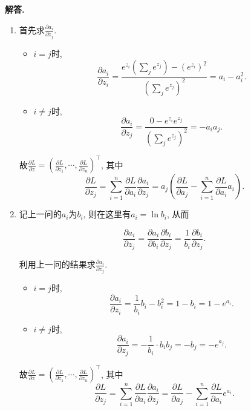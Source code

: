\documentclass[11pt]{article}
\newenvironment{solution}{\par\noindent\textbf{解答. }}{\par}
\begin{document}
	\section{}
	\begin{solution}
		\begin{enumerate}[(1)]
			\item 首先求$\frac{\partial a_i}{\partial z_j}$.
			
			\begin{itemize}
				\item $i=j$时, $$\frac{\partial a_i}{\partial z_i}=\frac{e^{z_i}(\sum_j e^{z_j})-(e^{z_i})^2}{(\sum_j e^{z_j})^2}=a_i-a_i^2.$$
				\item $i\neq j$时, $$\frac{\partial a_i}{\partial z_j}=\frac{0-e^{z_i}e^{z_j}}{(\sum_j e^{z_j})^2}=-a_ia_j.$$
			\end{itemize}

			故$\frac{\partial L}{\partial z}=\left(\frac{\partial L}{\partial z_1},\cdots,\frac{\partial L}{\partial z_n}\right)^\top$, 其中 $$\frac{\partial L}{\partial z_j}=\sum_{i=1}^n \frac{\partial L}{\partial a_i}\frac{\partial a_i}{\partial z_j}=a_j\left(\frac{\partial L}{\partial a_j}-\sum_{i=1}^n \frac{\partial L}{\partial a_i}a_i\right).$$

			\item 记上一问的$a_i$为$b_i$, 则在这里有$a_i=\ln b_i$, 从而
			
			$$\frac{\partial a_i}{\partial z_j}=\frac{\partial a_i}{\partial b_i}\frac{\partial b_i}{\partial z_j}=\frac{1}{b_i}\frac{\partial b_i}{\partial z_j}.$$

			利用上一问的结果求$\frac{\partial a_i}{\partial z_j}$.

			\begin{itemize}
				\item $i=j$时, $$\frac{\partial a_i}{\partial z_i}=\frac{1}{b_i}b_i-b_i^2=1-b_i=1-e^{a_i}.$$
				\item $i\neq j$时, $$\frac{\partial a_i}{\partial z_j}=-\frac{1}{b_i}\cdot b_ib_j=-b_j=-e^{a_j}.$$
			\end{itemize}

			故$\frac{\partial L}{\partial z}=\left(\frac{\partial L}{\partial z_1},\cdots,\frac{\partial L}{\partial z_n}\right)^\top$, 其中 $$\frac{\partial L}{\partial z_j}=\sum_{i=1}^n \frac{\partial L}{\partial a_i}\frac{\partial a_i}{\partial z_j}=\frac{\partial L}{\partial a_j}-\sum_{i=1}^n \frac{\partial L}{\partial a_i}e^{a_i}.$$
			
		\end{enumerate}
	\end{solution}
\end{document}
